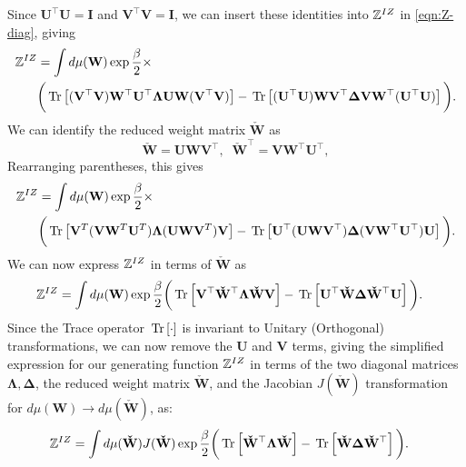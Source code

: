 Since $\mathbf{U}^{\top}\mathbf{U}=\mathbf{I}$ and $\mathbf{V}^{\top}\mathbf{V}=\mathbf{I}$,
%
we can insert these identities into $\mathbb{Z}^{IZ}$ in \ref{eqn:Z-diag}, giving
%
\begin{align}\label{eqn:Z0-diag}
\mathbb{Z}^{IZ} &= \int d\mu(\mathbf{W}) \exp\frac{\beta}{2}\times  \\ \nonumber
&\bigg(\mbox{}\operatorname{Tr}\left[(\mathbf{V}^{\top}\mathbf{V})\mathbf{W}^{\top}\mathbf{U}^{\top}\mathbf{\Lambda}\mathbf{U}\mathbf{W}(\mathbf{V}^{\top}\mathbf{V})\right] 
-\mbox{}\operatorname{Tr}\left[(\mathbf{U}^{\top} \mathbf{U})\mathbf{W}\mathbf{V}^{\top} \mathbf{\Delta} \mathbf{V}\mathbf{W}^{\top}(\mathbf{U}^{\top} \mathbf{U})\right]\bigg)  .
\end{align}
We can identify the reduced weight matrix $\mathbf{\check{W}}$ as
\begin{equation}
   \label{eqn:Wcheck}
   \mathbf{\check{W}}=\mathbf{U}\mathbf{W}\mathbf{V}^{\top},\;\;
   \mathbf{\check{W}}^{\top}=\mathbf{V}\mathbf{W}^{\top}\mathbf{U}^{\top}  ,
\end{equation}
Rearranging parentheses, this gives 
\begin{align}
\mathbb{Z}^{IZ} &= \int d\mu(\mathbf{W}) \exp\frac{\beta}{2}\times  \\ \nonumber
&\bigg(\mbox{}\operatorname{Tr}\left[\mathbf{V}^T(\mathbf{V}\mathbf{W}^T\mathbf{U}^T)\mathbf{\Lambda}(\mathbf{U}\mathbf{W}\mathbf{V}^T)\mathbf{V}\right]  
-\mbox{}\operatorname{Tr}\left[ \mathbf{U}^{\top}(\mathbf{U} \mathbf{W}\mathbf{V}^{\top})\mathbf{\Delta}(\mathbf{V}\mathbf{W}^{\top} \mathbf{U}^{\top})\mathbf{U} \right]\bigg)  .
\end{align}
We can now express $\mathbb{Z}^{IZ}$ in terms of $\mathbf{\check{W}}$ as
\begin{align}
\label{eqn:hciz-W-red}
\mathbb{Z}^{IZ} &= \int d\mu(\mathbf{W})\exp\frac{\beta}{2}
 \bigg(\mbox{}\operatorname{Tr}\left[\mathbf{V}^{\top}\mathbf{\check{W}}^{\top}\mathbf{\Lambda}\mathbf{\check{W}}\mathbf{V}\right] 
 -\mbox{}\operatorname{Tr}\left[\mathbf{U}^{\top}\mathbf{\check{W}}\mathbf{\Delta}\mathbf{\check{W}}^{\top}\mathbf{U}\right]\bigg)  .
\end{align}
Since the Trace operator $\mbox{}\operatorname{Tr}\left[\cdot\right]$ is invariant to Unitary (Orthogonal) transformations, we can
now remove the
$\mathbf{U}$ and $\mathbf{V}$ terms, giving the simplified expression
for our generating function $\mathbb{Z}^{IZ}$ in terms of
the two diagonal matrices $\mathbf{\Lambda}, \mathbf{\Delta}$, 
the reduced weight matrix $\mathbf{\check{W}}$, and
the Jacobian $J(\mathbf{\check{W}})$ transformation for $d\mu(\mathbf{W})\rightarrow d\mu(\mathbf{\check{W}})$, as:
\begin{align}
\label{eqn:hciz-W-red2}
    \mathbb{Z}^{IZ} & =\int d\mu(\mathbf{\check{W}})J(\mathbf{\check{W}})\exp\frac{\beta}{2}
 \bigg( \mbox{}\operatorname{Tr}\left[\mathbf{\check{W}}^{\top}\mathbf{\Lambda}\mathbf{\check{W}}\right] 
       -\mbox{}\operatorname{Tr}\left[\mathbf{\check{W}}\mathbf{\Delta} \mathbf{\check{W}}^{\top}\right] \bigg)  .
\end{align}


